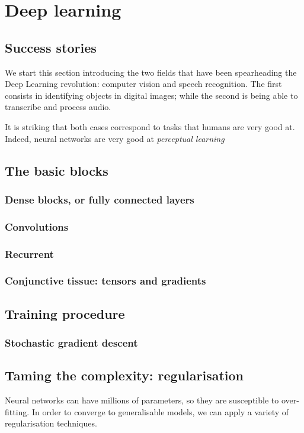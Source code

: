 \chapter{Deep learning}
\section{Success stories}
We start this section introducing the two fields that have been spearheading the Deep Learning revolution: computer vision and speech recognition.
The first consists in identifying objects in digital images; while the second is being able to transcribe and process audio.

It is striking that both cases correspond to tasks that humans are very good at.
Indeed, neural networks are very good at \emph{perceptual learning}

\section{The basic blocks}
\subsection{Dense blocks, or fully connected layers}
\subsection{Convolutions}
\subsection{Recurrent}

\subsection{Conjunctive tissue: tensors and gradients}

\section{Training procedure}

\subsection{Stochastic gradient descent}

\section{Taming the complexity: regularisation}
Neural networks can have millions of parameters, so they are susceptible to over-fitting.
In order to converge to generalisable models, we can apply a variety of regularisation techniques.

